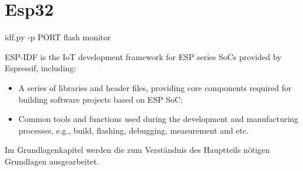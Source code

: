 \section{Esp32}

idf.py -p PORT flash monitor

ESP-IDF is the IoT development framework for ESP series SoCs provided by Espressif, including:


\begin{itemize}

    \item
    A series of libraries and header files, providing core components required for building software projects based on
    ESP SoC;



    \item Common tools and functions used during the development and
    manufacturing processes, e.g., build, flashing, debugging, measurement
    and etc.


\end{itemize}



Im Grundlagenkapitel werden die zum Verständnis des Hauptteils nötigen Grundlagen ausgearbeitet.